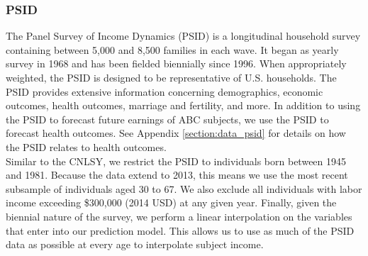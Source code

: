\subsubsection{PSID}
\label{app:subject_income_psid}

\noindent The Panel Survey of Income Dynamics (PSID) is a longitudinal household survey containing between 5,000
and 8,500 families in each wave. It began as yearly survey in 1968 and has been fielded biennially since 1996.
When appropriately weighted, the PSID is designed to be representative of U.S. households. The PSID
provides extensive information concerning demographics, economic outcomes, health outcomes, marriage
and fertility, and more. In addition to using the PSID to forecast future earnings of ABC subjects, we
use the PSID to forecast health outcomes. See Appendix \ref{section:data_psid} for details on how the
PSID relates to health outcomes. \\

\noindent Similar to the CNLSY, we restrict the PSID to individuals born between 1945 and 1981. Because the data
extend to 2013, this means we use the most recent subsample of individuals aged 30 to 67.
We also exclude all individuals with labor income exceeding \$300,000 (2014 USD) at any given year.
Finally, given the biennial nature of the survey, we perform a linear interpolation on the variables
that enter into our prediction model. This allows us to use as much of the PSID data as possible at
every age to interpolate subject income. \\

